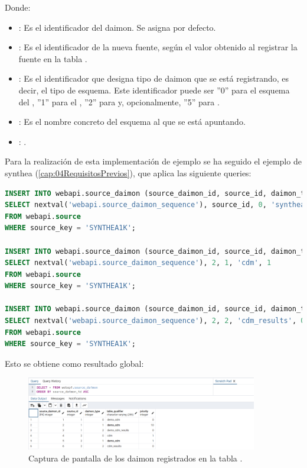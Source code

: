 \begin{enumerate}
    Donde:
    \begin{itemize}
        \item {}: Es el identificador del daimon. Se asigna por defecto.
        \item {}: Es el identificador de la nueva fuente, según el valor obtenido al registrar la fuente en la tabla .
        \item {}: Es el identificador que designa tipo de daimon que se está registrando, es decir, el tipo de esquema. Este identificador puede ser ''0'' para el esquema del , ''1'' para el , ''2'' para  y, opcionalmente, ''5'' para .
        \item {}: Es el nombre concreto del esquema al que se está apuntando.
        \item {}: \color{red}{valor entero mayor o menor que uno para ordenar}.
    \end{itemize}

    Para la realización de esta implementación de ejemplo se ha seguido el ejemplo de synthea (\ref{cap:04RequisitosPrevios}), que aplica las siguiente queries:

\begin{lstlisting}[language=sql]
INSERT INTO webapi.source_daimon (source_daimon_id, source_id, daimon_type, table_qualifier, priority) 
SELECT nextval('webapi.source_daimon_sequence'), source_id, 0, 'synthea', 0
FROM webapi.source
WHERE source_key = 'SYNTHEA1K';

INSERT INTO webapi.source_daimon (source_daimon_id, source_id, daimon_type, table_qualifier, priority) 
SELECT nextval('webapi.source_daimon_sequence'), 2, 1, 'cdm', 1
FROM webapi.source
WHERE source_key = 'SYNTHEA1K';

INSERT INTO webapi.source_daimon (source_daimon_id, source_id, daimon_type, table_qualifier, priority) 
SELECT nextval('webapi.source_daimon_sequence'), 2, 2, 'cdm_results', 0
FROM webapi.source
WHERE source_key = 'SYNTHEA1K';
\end{lstlisting}

    Esto se obtiene como resultado global:

\begin{figure}[H]
    \centering
    \includegraphics[width=0.90\textwidth]{figures/queryDaimon.png}
    \caption{Captura de pantalla de los daimon registrados en la tabla .}
    \label{fig:queryDaimon}
\end{figure}


\end{enumerate}
